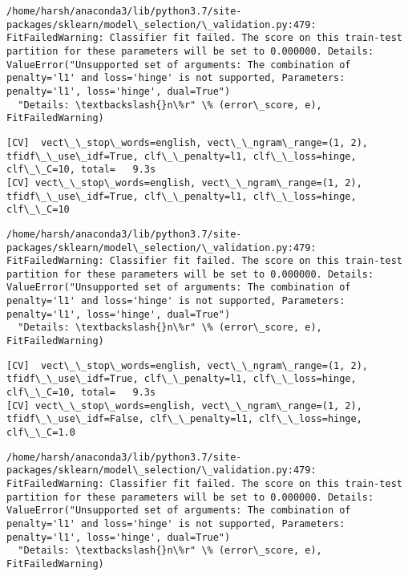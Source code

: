 \documentclass[11pt]{article}
\begin{document}
    \begin{Verbatim}[commandchars=\\\{\}]
/home/harsh/anaconda3/lib/python3.7/site-packages/sklearn/model\_selection/\_validation.py:479: FitFailedWarning: Classifier fit failed. The score on this train-test partition for these parameters will be set to 0.000000. Details: 
ValueError("Unsupported set of arguments: The combination of penalty='l1' and loss='hinge' is not supported, Parameters: penalty='l1', loss='hinge', dual=True")
  "Details: \textbackslash{}n\%r" \% (error\_score, e), FitFailedWarning)

    \end{Verbatim}

    \begin{Verbatim}[commandchars=\\\{\}]
[CV]  vect\_\_stop\_words=english, vect\_\_ngram\_range=(1, 2), tfidf\_\_use\_idf=True, clf\_\_penalty=l1, clf\_\_loss=hinge, clf\_\_C=10, total=   9.3s
[CV] vect\_\_stop\_words=english, vect\_\_ngram\_range=(1, 2), tfidf\_\_use\_idf=True, clf\_\_penalty=l1, clf\_\_loss=hinge, clf\_\_C=10 

    \end{Verbatim}

    \begin{Verbatim}[commandchars=\\\{\}]
/home/harsh/anaconda3/lib/python3.7/site-packages/sklearn/model\_selection/\_validation.py:479: FitFailedWarning: Classifier fit failed. The score on this train-test partition for these parameters will be set to 0.000000. Details: 
ValueError("Unsupported set of arguments: The combination of penalty='l1' and loss='hinge' is not supported, Parameters: penalty='l1', loss='hinge', dual=True")
  "Details: \textbackslash{}n\%r" \% (error\_score, e), FitFailedWarning)

    \end{Verbatim}

    \begin{Verbatim}[commandchars=\\\{\}]
[CV]  vect\_\_stop\_words=english, vect\_\_ngram\_range=(1, 2), tfidf\_\_use\_idf=True, clf\_\_penalty=l1, clf\_\_loss=hinge, clf\_\_C=10, total=   9.3s
[CV] vect\_\_stop\_words=english, vect\_\_ngram\_range=(1, 2), tfidf\_\_use\_idf=False, clf\_\_penalty=l1, clf\_\_loss=hinge, clf\_\_C=1.0 

    \end{Verbatim}

    \begin{Verbatim}[commandchars=\\\{\}]
/home/harsh/anaconda3/lib/python3.7/site-packages/sklearn/model\_selection/\_validation.py:479: FitFailedWarning: Classifier fit failed. The score on this train-test partition for these parameters will be set to 0.000000. Details: 
ValueError("Unsupported set of arguments: The combination of penalty='l1' and loss='hinge' is not supported, Parameters: penalty='l1', loss='hinge', dual=True")
  "Details: \textbackslash{}n\%r" \% (error\_score, e), FitFailedWarning)

    \end{Verbatim}
\end{document}
